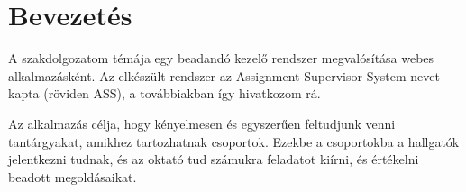 \chapter{Bevezetés}
\label{ch:intro}

A szakdolgozatom témája egy beadandó kezelő rendszer megvalósítása webes alkalmazásként. Az elkészült rendszer az Assignment Supervisor System nevet kapta (röviden ASS), a továbbiakban így hivatkozom rá.

Az alkalmazás célja, hogy kényelmesen és egyszerűen feltudjunk venni tantárgyakat, amikhez tartozhatnak csoportok. Ezekbe a csoportokba a hallgatók jelentkezni tudnak, és az oktató tud számukra feladatot kiírni, és értékelni beadott megoldásaikat.